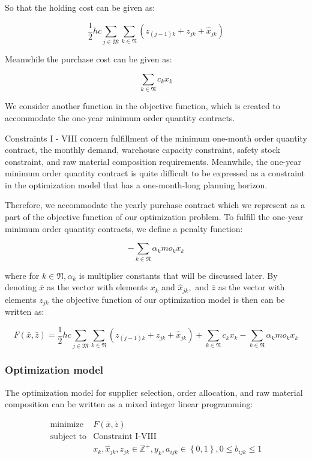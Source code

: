 \documentclass[preprint, 3p,
authoryear]{elsarticle} %
\begin{document}
So that the holding cost can be given as:

\[
\frac{1}{2} hc \sum_{j \in \mathfrak{M}} \sum_{k \in \mathfrak{N}} (z_{(j-1)k} + z_{jk} + \hat{x}_{jk})
\]

Meanwhile the purchase cost can be given as:

\[
  \sum_{k \in \mathfrak{N}} c_k x_k
\]

We consider another function in the objective function, which is created
to accommodate the one-year minimum order quantity contracts.

Constraints I - VIII concern fulfillment of the minimum one-month order
quantity contract, the monthly demand, warehouse capacity constraint,
safety stock constraint, and raw material composition requirements.
Meanwhile, the one-year minimum order quantity contract is quite
difficult to be expressed as a constraint in the optimization model that
has a one-month-long planning horizon.

Therefore, we accommodate the yearly purchase contract which we
represent as a part of the objective function of our optimization
problem. To fulfill the one-year minimum order quantity contracts, we
define a penalty function:

\[
  - \sum_{k \in \mathfrak{N}} \alpha_k mo_k x_k
\]

where for \(k \in \mathfrak{N}, \alpha_k\) is multiplier constants that
will be discussed later. By denoting \(\bar{x}\) as the vector with
elements \(x_k\) and \(\hat{x}_{jk},\) and \(\bar{z}\) as the vector
with elements \(z_{jk}\) the objective function of our optimization
model is then can be written as:

\[
  F(\bar{x},\bar{z}) = \frac{1}{2} hc \sum_{j \in \mathfrak{M}} \sum_{k \in \mathfrak{N}} (z_{(j-1)k} + z_{jk} + \hat{x}_{jk}) + \sum_{k \in \mathfrak{N}} c_k x_k - \sum_{k \in \mathfrak{N}} \alpha_k mo_k x_k
\]

\hypertarget{optimization-model}{%
\subsubsection{Optimization model}\label{optimization-model}}

The optimization model for supplier selection, order allocation, and raw
material composition can be written as a mixed integer linear
programming:

\[
\begin{matrix}
\text{minimize} & F(\bar{x},\bar{z}) \\
\text{subject to} & \text{Constraint I-VIII} \\
 & x_k, \hat{x}_{jk}, z_{jk} \in \mathbb{Z}^+, y_k, a_{ijk} \in \left\{0,1 \right\}, 0 \leq b_{ijk} \leq 1
\end{matrix}
\]
\end{document}
